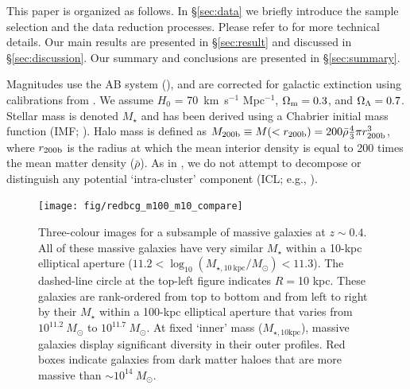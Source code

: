 \documentclass[a4paper,fleqn,usenatbib]{mnras}
\def\mstar{{$M_{\star}$}}
\def\minn{{$M_{\star,10\mathrm{kpc}}$}}
\begin{document}
    This paper is organized as follows. 
    In \S \ref{sec:data} we briefly introduce the sample selection and the data 
    reduction processes.  
    Please refer to \citet{hscMassiveI} for more technical details.
    Our main results are presented in \S \ref{sec:result} and discussed in 
    \S \ref{sec:discussion}. 
    Our summary and conclusions are presented in \S \ref{sec:summary}.

    Magnitudes use the AB system (\citealt{Oke1983}), and are corrected for galactic 
    extinction using calibrations from \citet{Schlafly11}. 
    We assume $H_0$ = 70~km~s$^{-1}$ Mpc$^{-1}$, ${\Omega}_{\rm m}=0.3$, 
    and ${\Omega}_{\rm \Lambda}=0.7$.
    Stellar mass is denoted \mstar{} and has been derived using a Chabrier initial mass 
    function (IMF; \citealt{Chabrier2003}). Halo mass is defined as 
    $M_{\rm 200b}\equiv M(<r_{\rm 200b})=200\bar{\rho} 
    \frac{4}{3}\pi r_{\rm 200b}^3$, where $r_{\rm 200b}$
    is the radius at which the mean interior density is equal to 200 times
    the mean matter density ($\bar{\rho}$). 
    As in \citet{hscMassiveI}, we do not attempt to decompose or distinguish any  
    potential `intra-cluster' 
    component (ICL; e.g., \citealt{Carlberg1997, Lin2004, Gonzalez2005, Mihos2005}). 
    

  \begin{figure}
      \centering 
      \texttt{[image: fig/redbcg\_m100\_m10\_compare]}
      \caption{
          Three-colour images for a subsample of massive galaxies at $z{\sim}0.4$. 
          All of these massive galaxies have very similar \mstar{} within a 10-kpc 
          elliptical aperture 
          ($11.2<\log_{10} (M_{\star,10\ \mathrm{kpc}}/M_{\odot})<11.3$). 
          The dashed-line circle at the top-left figure indicates $R=$10 kpc.
          These galaxies are rank-ordered from top to bottom and from left to right 
          by their \mstar{} within a 100-kpc elliptical aperture that varies 
          from $10^{11.2}\ M_{\odot}$ to $10^{11.7}\ M_{\odot}$. 
          At fixed `inner' mass (\minn{}), massive galaxies display significant
          diversity in their outer profiles. 
          Red boxes indicate galaxies from dark matter haloes that are more massive 
          than ${\sim} 10^{14}\ M_{\odot}$. 
          }
      \label{fig:m100_m10_color}
  \end{figure}
\end{document}
